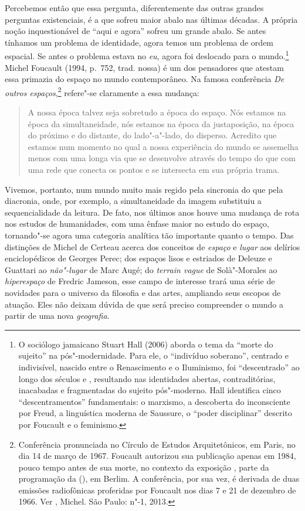 Percebemos então que essa pergunta, diferentemente das outras grandes
perguntas existenciais, é a que sofreu maior abalo nas últimas décadas.
A própria noção inquestionável de ``aqui e agora'' sofreu um grande
abalo. Se antes tínhamos um problema de identidade, agora temos um
problema de ordem espacial. Se antes o problema estava no \emph{eu},
agora foi deslocado para o mundo.\footnote{O sociólogo jamaicano Stuart
  Hall (2006) aborda o tema da ``morte do sujeito'' na pós"-modernidade.
  Para ele, o ``indivíduo soberano'', centrado e indivisível, nascido
  entre o Renascimento e o Iluminismo, foi ``descentrado'' ao longo dos
  séculos  e , resultando nas identidades abertas, contraditórias,
  inacabadas e fragmentadas do sujeito pós"-moderno. Hall identifica
  cinco ``descentramentos'' fundamentais: o marxismo, a descoberta do
  inconsciente por Freud, a linguística moderna de Saussure, o ``poder
  disciplinar'' descrito por Foucault e o feminismo.} Michel Foucault
(1994, p.~752, trad. nossa) é
um dos pensadores que atestam essa primazia do espaço no mundo
contemporâneo. Na famosa conferência \emph{De outros espaços},\footnote{Conferência
  pronunciada no Círculo de Estudos Arquitetônicos, em Paris, no dia 14
  de março de 1967. Foucault autorizou sua publicação apenas em 1984,
  pouco tempo antes de sua morte, no contexto da exposição {}, parte da programação da {} (), em Berlim. A conferência, por sua vez, é
  derivada de duas emissões radiofônicas proferidas por Foucault nos
  dias 7 e 21 de dezembro de 1966. Ver , Michel. {} São Paulo: n"-1, 2013.} refere"-se claramente
a essa mudança:

\begin{quote}
A nossa época talvez seja sobretudo a época do espaço. Nós estamos na
época da simultaneidade, nós estamos na época da justaposição, na época
do próximo e do distante, do lado"-a"-lado, do disperso. Acredito que
estamos num momento no qual a nossa experiência do mundo se assemelha
menos com uma longa via que se desenvolve através do tempo do que com
uma rede que conecta os pontos e se intersecta em sua própria trama.
\end{quote}

Vivemos, portanto, num mundo muito mais regido pela sincronia do que
pela diacronia, onde, por exemplo, a simultaneidade da imagem substituiu
a sequencialidade da leitura. De fato, nos últimos anos houve uma
mudança de rota nos estudos de humanidades, com uma ênfase maior no
estudo do espaço, tornando"-se agora uma categoria analítica tão
importante quanto o tempo. Das distinções de Michel de Certeau acerca
dos conceitos de \emph{espaço} e \emph{lugar} aos delírios
enciclopédicos de Georges Perec; dos espaços lisos e estriados de
Deleuze e Guattari ao \emph{não"-lugar} de Marc Augé; do \emph{terrain
vague} de Solà"-Morales ao \emph{hiperespaço} de Fredric Jameson, esse
campo de interesse trará uma série de novidades para o universo da
filosofia e das artes, ampliando seus escopos de atuação. Eles não
deixam dúvida de que será preciso compreender o mundo a partir de uma
nova \emph{geografia}.

